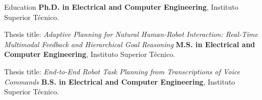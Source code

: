 \begin{rubric}{Education}
\entry*[2025--Present]%
    \textbf{Ph.D. in Electrical and Computer Engineering}, Instituto Superior Técnico.    \par Thesis title: \emph{ Adaptive Planning for Natural Human-Robot Interaction: Real-Time Multimodal Feedback and Hierarchical Goal Reasoning }%
\entry*[2022--2024]%
    \textbf{M.S. in Electrical and Computer Engineering}, Instituto Superior Técnico.    \par Thesis title: \emph{ End-to-End Robot Task Planning from Transcriptions of Voice Commands }%
\entry*[2019--2022]%
    \textbf{B.S. in Electrical and Computer Engineering}, Instituto Superior Técnico.%
\end{rubric}